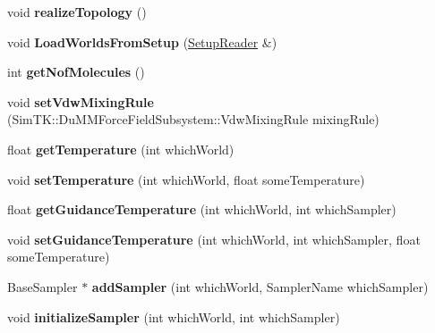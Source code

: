 \begin{DoxyCompactItemize}
\item 
void {\bfseries realize\+Topology} ()\hypertarget{classContext_a713fd59ba4a18056e3b359d1c8a669e0}{}\label{classContext_a713fd59ba4a18056e3b359d1c8a669e0}

\item 
void {\bfseries Load\+Worlds\+From\+Setup} (\hyperlink{classSetupReader}{Setup\+Reader} \&)\hypertarget{classContext_a7a7e949c06bc4eaec17f532ef6d58158}{}\label{classContext_a7a7e949c06bc4eaec17f532ef6d58158}

\item 
int {\bfseries get\+Nof\+Molecules} ()\hypertarget{classContext_ac55253cfbdd83b5966c7ee38494fea9c}{}\label{classContext_ac55253cfbdd83b5966c7ee38494fea9c}

\item 
void {\bfseries set\+Vdw\+Mixing\+Rule} (Sim\+T\+K\+::\+Du\+M\+M\+Force\+Field\+Subsystem\+::\+Vdw\+Mixing\+Rule mixing\+Rule)\hypertarget{classContext_a5f797c56bf76df0f1f943737071c4d95}{}\label{classContext_a5f797c56bf76df0f1f943737071c4d95}

\item 
float {\bfseries get\+Temperature} (int which\+World)\hypertarget{classContext_ae59336ed3797d3efac98d0142d1dc79c}{}\label{classContext_ae59336ed3797d3efac98d0142d1dc79c}

\item 
void {\bfseries set\+Temperature} (int which\+World, float some\+Temperature)\hypertarget{classContext_a5bcedc50b4316f5b47ec0fee42daeeab}{}\label{classContext_a5bcedc50b4316f5b47ec0fee42daeeab}

\item 
float {\bfseries get\+Guidance\+Temperature} (int which\+World, int which\+Sampler)\hypertarget{classContext_aa304e434bf030976e7075ffe040ee949}{}\label{classContext_aa304e434bf030976e7075ffe040ee949}

\item 
void {\bfseries set\+Guidance\+Temperature} (int which\+World, int which\+Sampler, float some\+Temperature)\hypertarget{classContext_ada1e12614883a246b745bb650fce2bec}{}\label{classContext_ada1e12614883a246b745bb650fce2bec}

\item 
Base\+Sampler $\ast$ {\bfseries add\+Sampler} (int which\+World, Sampler\+Name which\+Sampler)\hypertarget{classContext_a561523aef8ecc0f49fa903c291b51213}{}\label{classContext_a561523aef8ecc0f49fa903c291b51213}

\item 
void {\bfseries initialize\+Sampler} (int which\+World, int which\+Sampler)\hypertarget{classContext_a7a019024e7574751c77df9b0229ebae8}{}\label{classContext_a7a019024e7574751c77df9b0229ebae8}


\end{DoxyCompactItemize}

